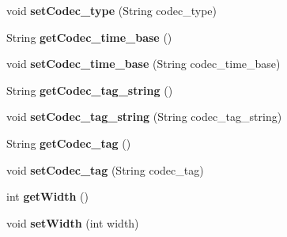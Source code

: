 \begin{DoxyCompactItemize}
\item 
\hypertarget{classjson__objects_1_1_stream_aec037d0c7869dc7bb5ce33fd75bcc5a4}{
void {\bfseries setCodec\_\-type} (String codec\_\-type)}
\label{classjson__objects_1_1_stream_aec037d0c7869dc7bb5ce33fd75bcc5a4}

\item 
\hypertarget{classjson__objects_1_1_stream_a758606c0196afa49930ddac18c350e06}{
String {\bfseries getCodec\_\-time\_\-base} ()}
\label{classjson__objects_1_1_stream_a758606c0196afa49930ddac18c350e06}

\item 
\hypertarget{classjson__objects_1_1_stream_ac58c8c46f9a922bb2af89a3877c0b075}{
void {\bfseries setCodec\_\-time\_\-base} (String codec\_\-time\_\-base)}
\label{classjson__objects_1_1_stream_ac58c8c46f9a922bb2af89a3877c0b075}

\item 
\hypertarget{classjson__objects_1_1_stream_a4d32a66aa709e7b39f9cc85260b29ba8}{
String {\bfseries getCodec\_\-tag\_\-string} ()}
\label{classjson__objects_1_1_stream_a4d32a66aa709e7b39f9cc85260b29ba8}

\item 
\hypertarget{classjson__objects_1_1_stream_a62a0eeb887beadaa5415e43b84a6544c}{
void {\bfseries setCodec\_\-tag\_\-string} (String codec\_\-tag\_\-string)}
\label{classjson__objects_1_1_stream_a62a0eeb887beadaa5415e43b84a6544c}

\item 
\hypertarget{classjson__objects_1_1_stream_aa5eead6f579a0f5498989b5d995a9b8b}{
String {\bfseries getCodec\_\-tag} ()}
\label{classjson__objects_1_1_stream_aa5eead6f579a0f5498989b5d995a9b8b}

\item 
\hypertarget{classjson__objects_1_1_stream_ade703d54ff89769f1ec3e098ed216447}{
void {\bfseries setCodec\_\-tag} (String codec\_\-tag)}
\label{classjson__objects_1_1_stream_ade703d54ff89769f1ec3e098ed216447}

\item 
\hypertarget{classjson__objects_1_1_stream_a309ae391c21a7cff56844951392654a4}{
int {\bfseries getWidth} ()}
\label{classjson__objects_1_1_stream_a309ae391c21a7cff56844951392654a4}

\item 
\hypertarget{classjson__objects_1_1_stream_afd15f7dd75d1ed84b05ab2304e1108f0}{
void {\bfseries setWidth} (int width)}
\label{classjson__objects_1_1_stream_afd15f7dd75d1ed84b05ab2304e1108f0}


\end{DoxyCompactItemize}
